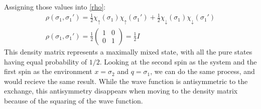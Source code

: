 \documentclass{article}
\begin{document}
Assigning those values into \ref{rho}:
\begin{equation}
\begin{gathered}
    \rho(\sigma_1, \sigma_1') = \frac{1}{2}\chi_{\uparrow}(\sigma_1)\chi_{\uparrow}(\sigma_1') + \frac{1}{2}\chi_{\downarrow}(\sigma_1)\chi_{\downarrow}(\sigma_1') \\
    \rho(\sigma_1, \sigma_1') = \frac{1}{2}\begin{pmatrix}
        1 & 0 \\
        0 & 1
    \end{pmatrix} = \frac{1}{2}I
\end{gathered}
\end{equation}
This density matrix represents a maximally mixed state, with all the pure states having equal probability of $1/2$.
\newline
Looking at the second spin as the system and the first spin as the environment $x = \sigma_2$ and $q = \sigma_1$, we can do the same process, and would recieve the same result. While the wave function is antisymmetric to the exchange, this antisymmetry disappears when moving to the density matrix because of the squaring of the wave function.
\end{document}
